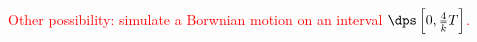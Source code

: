 \documentclass[aspectratio=169]{beamer}
\begin{document}
\begin{frame}[noframenumbering]
\begin{center}
 \textcolor{red}{Other possibility: simulate a Borwnian motion on an interval $\dps \left[0, \frac{4}{\overline{k}} T \right]$.}
  \end{center}
\end{frame}
\end{document}
